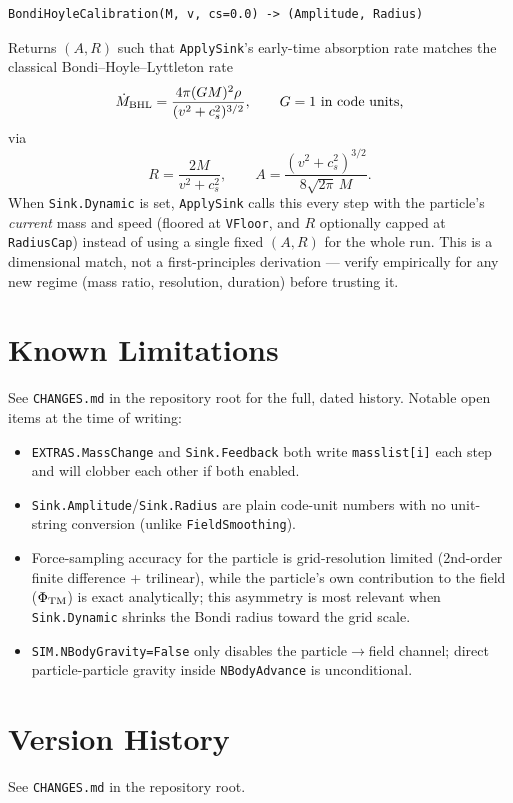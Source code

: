 \documentclass[11pt]{article}
\newcommand{\code}[1]{\texttt{#1}}
\newcommand{\field}[1]{\texttt{#1}}
\begin{document}
\begin{verbatim}
BondiHoyleCalibration(M, v, cs=0.0) -> (Amplitude, Radius)
\end{verbatim}
Returns $(A,R)$ such that \code{ApplySink}'s early-time absorption rate
matches the classical Bondi--Hoyle--Lyttleton rate
\begin{equation}
  \dot M_{\rm BHL} = \frac{4\pi (GM)^2\rho}{(v^2+c_s^2)^{3/2}}, \qquad G=1
  \text{ in code units,}
\end{equation}
via
\begin{equation}
  R = \frac{2M}{v^2+c_s^2}, \qquad
  A = \frac{(v^2+c_s^2)^{3/2}}{8\sqrt{2\pi}\,M}.
\end{equation}
When \field{Sink.Dynamic} is set, \code{ApplySink} calls this every step with
the particle's \emph{current} mass and speed (floored at \field{VFloor}, and
$R$ optionally capped at \field{RadiusCap}) instead of using a single fixed
$(A,R)$ for the whole run. This is a dimensional match, not a first-principles
derivation --- verify empirically for any new regime (mass ratio, resolution,
duration) before trusting it.

\section{Known Limitations}

See \code{CHANGES.md} in the repository root for the full, dated history.
Notable open items at the time of writing:
\begin{itemize}
  \item \field{EXTRAS.MassChange} and \field{Sink.Feedback} both write
    \code{masslist[i]} each step and will clobber each other if both enabled.
  \item \field{Sink.Amplitude}/\field{Sink.Radius} are plain code-unit numbers
    with no unit-string conversion (unlike \field{FieldSmoothing}).
  \item Force-sampling accuracy for the particle is grid-resolution limited
    (2nd-order finite difference + trilinear), while the particle's own
    contribution to the field ($\Phi_{\rm TM}$) is exact analytically; this
    asymmetry is most relevant when \field{Sink.Dynamic} shrinks the Bondi
    radius toward the grid scale.
  \item \field{SIM.NBodyGravity}\code{=False} only disables the
    particle$\to$field channel; direct particle-particle gravity inside
    \code{NBodyAdvance} is unconditional.
\end{itemize}

\section{Version History}

See \code{CHANGES.md} in the repository root.
\end{document}
